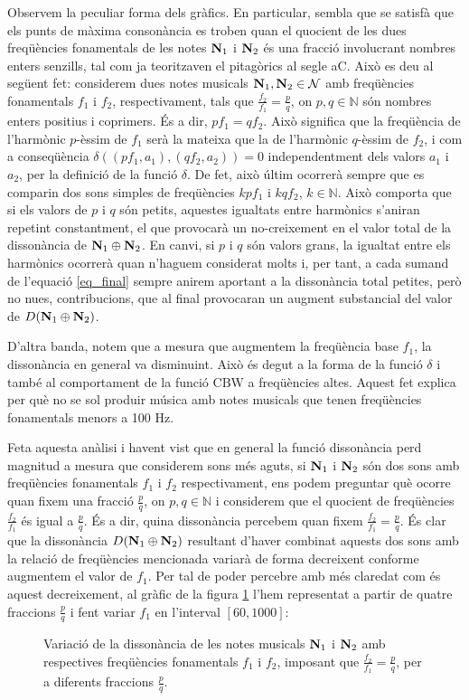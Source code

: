 \documentclass{article}
\theoremstyle{math}
\theoremstyle{TheoremNum}
\newcommand{\0}{\ensuremath{\vb{0}}}
\newcommand{\N}{\ensuremath{\vb{N}}}
\newcommand{\NN}{\ensuremath{\mathbb{N}}} %
\begin{document}
Observem la peculiar forma dels gràfics. En particular, sembla que se satisfà que els punts de màxima consonància es troben quan el quocient de les dues freqüències fonamentals de les notes $\N_1$ i $\N_2$ és una fracció involucrant nombres enters senzills, tal com ja teoritzaven el pitagòrics al segle \MakeUppercase{} aC. Això es deu al següent fet: considerem dues notes musicals $\N_1,\N_2\in\mathcal{N}$ amb freqüències fonamentals $f_1$ i $f_2$, respectivament, tals que $\frac{f_2}{f_1}=\frac{p}{q}$, on $p,q\in\NN$ són nombres enters positius i coprimers. És a dir, $pf_1=qf_2$. Això significa que la freqüència de l'harmònic $p$-èssim de $f_1$ serà la mateixa que la de l'harmònic $q$-èssim de $f_2$, i com a conseqüència $\delta((pf_1,a_1),(qf_2,a_2))=0$ independentment dels valors $a_1$ i $a_2$, per la definició de la funció $\delta$. De fet, això últim ocorrerà sempre que es comparin dos sons simples de freqüències $kpf_1$ i $kqf_2$, $k\in\NN$. Això comporta que si els valors de $p$ i $q$ són petits, aquestes igualtats entre harmònics s'aniran repetint constantment, el que provocarà un no-creixement en el valor total de la dissonància de $\N_1\oplus\N_2$. En canvi, si $p$ i $q$ són valors grans, la igualtat entre els harmònics ocorrerà quan n'haguem considerat molts i, per tant, a cada sumand de l'equació \eqref{eq_final} sempre anirem aportant a la dissonància total petites, però no nu\lgem es, contribucions, que al final provocaran un augment substancial del valor de $D(\N_1\oplus\N_2)$.\par
D'altra banda, notem que a mesura que augmentem la freqüència base $f_1$, la dissonància en general va disminuint. Això és degut a la forma de la funció $\delta$ i també al comportament de la funció $\text{CBW}$ a freqüències altes. Aquest fet explica per què no se sol produir música amb notes musicals que tenen freqüències fonamentals menors a 100 Hz.\par Feta aquesta anàlisi i havent vist que en general la funció dissonància perd magnitud a mesura que considerem sons més aguts, si $\N_1$ i $\N_2$ són dos sons amb freqüències fonamentals $f_1$ i $f_2$ respectivament, ens podem preguntar què ocorre quan fixem una fracció $\frac{p}{q}$, on $p,q\in\NN$ i considerem que el quocient de freqüències $\frac{f_2}{f_1}$ és igual a $\frac{p}{q}$. És a dir, quina dissonància percebem quan fixem $\frac{f_2}{f_1}=\frac{p}{q}$. És clar que la dissonància $D(\N_1\oplus\N_2)$ resultant d'haver combinat aquests dos sons amb la relació de freqüències mencionada variarà de forma decreixent conforme augmentem el valor de $f_1$. Per tal de poder percebre amb més claredat com és aquest decreixement, al gràfic de la figura \ref{fraccio_pq} l'hem representat a partir de quatre fraccions $\frac{p}{q}$ i fent variar $f_1$ en l'interval $[60,1000]$:
\begin{figure}[ht]
  \centering
  
  \caption{Variació de la dissonància de les notes musicals $\N_1$ i $\N_2$ amb respectives freqüències fonamentals $f_1$ i $f_2$, imposant que $\frac{f_2}{f_1}=\frac{p}{q}$, per a diferents fraccions $\frac{p}{q}$.}
  \label{fraccio_pq}
\end{figure}
\end{document}
